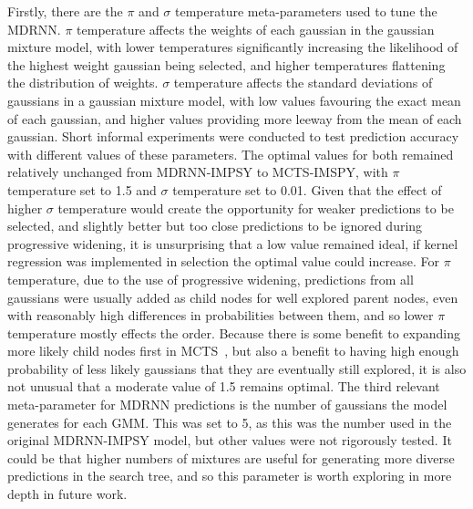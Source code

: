 Firstly, there are the $\pi$ and $\sigma$ temperature meta-parameters used to tune the MDRNN. $\pi$ temperature affects the weights of each gaussian in the gaussian mixture model, with lower temperatures significantly increasing the likelihood of the highest weight gaussian being selected, and higher temperatures flattening the distribution of weights. $\sigma$ temperature affects the standard deviations of gaussians in a gaussian mixture model, with low values favouring the exact mean of each gaussian, and higher values providing more leeway from the mean of each gaussian. Short informal experiments were conducted to test prediction accuracy with different values of these parameters. The optimal values for both remained relatively unchanged from MDRNN-IMPSY to MCTS-IMSPY, with $\pi$ temperature set to 1.5 and $\sigma$ temperature set to 0.01. Given that the effect of higher $\sigma$ temperature would create the opportunity for weaker predictions to be selected, and slightly better but too close predictions to be ignored during progressive widening, it is unsurprising that a low value remained ideal, if kernel regression was implemented in selection the optimal value could increase. For $\pi$ temperature, due to the use of progressive widening, predictions from all gaussians were usually added as child nodes for well explored parent nodes, even with reasonably high differences in probabilities between them, and so lower $\pi$ temperature mostly effects the order. Because there is some benefit to expanding more likely child nodes first in MCTS~\citep{Silver2016AlphaGo}, but also a benefit to having high enough probability of less likely gaussians that they are eventually still explored, it is also not unusual that a moderate value of 1.5 remains optimal. The third relevant meta-parameter for MDRNN predictions is the number of gaussians the model generates for each GMM. This was set to 5, as this was the number used in the original MDRNN-IMPSY model, but other values were not rigorously tested. It could be that higher numbers of mixtures are useful for generating more diverse predictions in the search tree, and so this parameter is worth exploring in more depth in future work.

